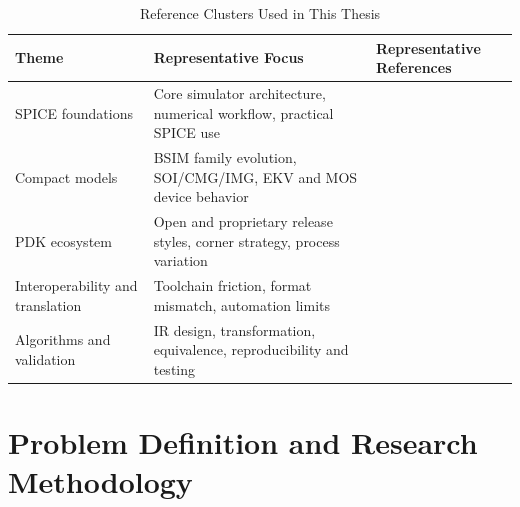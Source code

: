 \documentclass[12pt,a4paper,oneside]{report}
\begin{document}
\begin{table}[H]
\centering
\caption{Reference Clusters Used in This Thesis}
\label{tab:lit-clusters}
\begin{tabular}{p{3.0cm}p{7.8cm}p{3.2cm}}
\toprule
Theme & Representative Focus & Representative References \\
\midrule
SPICE foundations & Core simulator architecture, numerical workflow, practical SPICE use & \cite{spice70,spice3,spicebook,vladimirescu,kundert} \\
Compact models & BSIM family evolution, SOI/CMG/IMG, EKV and MOS device behavior & \cite{bsim1,bsim2,bsim3,bsim4,bsimsoi,bsimcmg,bsimimg,ekv_model,mos_modeling,semiconductor_physics} \\
PDK ecosystem & Open and proprietary release styles, corner strategy, process variation & \cite{pdk_method,pdk_variation,corner_analysis,mc_analysis,openpdk,sky130_pdk,gf180_pdk,asap7_pdk,freepdk45} \\
Interoperability and translation & Toolchain friction, format mismatch, automation limits & \cite{eda_interop,eda_standards,cad_flow_survey,translation_limits,software_lockin,edacurry,llm_eda_dataset,autospice} \\
Algorithms and validation & IR design, transformation, equivalence, reproducibility and testing & \cite{compiler_dragon,llvm_ir,program_transformations,equiv_checking,formal_methods_sim,reproducibility_science,software_testing,continuous_integration,scientific_workflows} \\
\bottomrule
\end{tabular}
\end{table}

\chapter{Problem Definition and Research Methodology}
\end{document}
